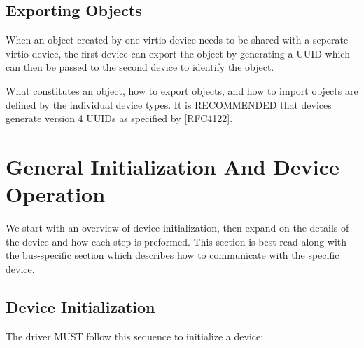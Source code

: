 

\section{Exporting Objects}\label{sec:Basic Facilities of a Virtio Device / Exporting Objects}

When an object created by one virtio device needs to be
shared with a seperate virtio device, the first device can
export the object by generating a UUID which can then
be passed to the second device to identify the object.

What constitutes an object, how to export objects, and
how to import objects are defined by the individual device
types. It is RECOMMENDED that devices generate version 4
UUIDs as specified by \hyperref[intro:rfc4122]{[RFC4122]}.

\chapter{General Initialization And Device Operation}\label{sec:General Initialization And Device Operation}

We start with an overview of device initialization, then expand on the
details of the device and how each step is preformed.  This section
is best read along with the bus-specific section which describes
how to communicate with the specific device.

\section{Device Initialization}\label{sec:General Initialization And Device Operation / Device Initialization}

The driver MUST follow this sequence to initialize a device:


